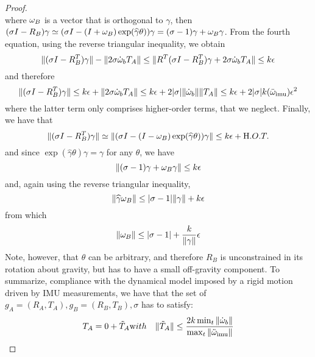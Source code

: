 \begin{proof}
\begin{equation}
\end{equation}
where $\omega_B$ is a vector that is orthogonal to $\gamma$, 
then $(\sigma I - R_B)\gamma \simeq (\sigma I - (I + \omega_B)\exp(\widehat \gamma \theta))\gamma = (\sigma - 1)\gamma + \omega_B \gamma$. 
From the fourth equation, using the reverse triangular inequality, we obtain 
\begin{equation}
\| (\sigma I - R_B^T)\gamma \| - \| 2\sigma \dot {\omega}_b T_A \| \le \| R^T(\sigma I - R_B^T)\gamma + 2 \sigma \dot{\omega}_b T_A \| \le k\epsilon
\end{equation}
and therefore
\begin{equation}
\| (\sigma I - R_B^T)\gamma \|   \le k\epsilon + \| 2\sigma \dot {\omega}_b T_A \| \le k\epsilon + 2 |\sigma| \|\dot {\omega}_b\| \| T_A \| \le 
k\epsilon + 2 |\sigma| k(\ddot {\omega}_\mathrm{imu} ) \epsilon^2 
\end{equation}
where the latter term only comprises higher-order terms, that we neglect. Finally, we have that
\begin{equation}
\| (\sigma I - R_B^T)\gamma \| \simeq \| (\sigma I - (I -\omega_B)\exp(\widehat \gamma \theta))\gamma \| \le k\epsilon + {\mathrm H. O. T.}
\end{equation}
and since $\exp(\widehat \gamma \theta)\gamma = \gamma$ for any $\theta$, we have
\begin{equation}
\| (\sigma -1)\gamma + \omega_B \gamma \| \le k\epsilon
\end{equation}
and, again using the reverse triangular inequality, 
\begin{equation}
\| \widehat \gamma \omega_B \| \le |\sigma -1| \| \gamma \| +   k \epsilon
\end{equation}
from which 
\begin{equation}
\| \w_B \| \le |\sigma -1|  +  \frac{k}{\| \gamma \|} \epsilon%
\end{equation}
Note, however, that $\theta$ can be arbitrary, and therefore $R_B$ is unconstrained in its rotation about gravity, but has to have a small off-gravity component. To summarize, compliance with the dynamical model imposed by a rigid motion driven by IMU measurements, we have that the set of $g_A = (R_A, T_A), g_B = (R_B, T_B), \sigma$ has to satisfy: 
\begin{eqnarray}
T_A  =  0 + \tilde T_A &{\mathrm with}& \| \tilde T_A \| \le \frac{2 k \min_t \| \dot \w_b \| }{\max_t \| \ddot \w\imu  \|}  \\

\end{eqnarray}
\end{proof}
